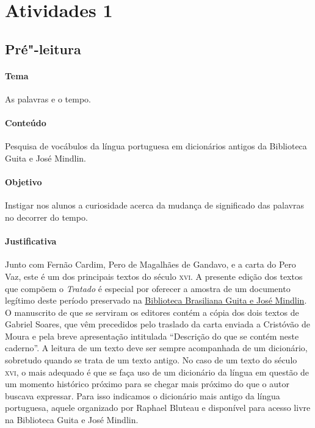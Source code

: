 \documentclass[12pt]{extarticle}
\begin{document}
\tableofcontents

\section{Atividades 1}


\subsection{Pré"-leitura}


\paragraph{Tema} As palavras e o tempo. 

\paragraph{Conteúdo} Pesquisa de vocábulos da língua portuguesa em 
dicionários antigos da Biblioteca Guita e José Mindlin. 

\paragraph{Objetivo} Instigar nos alunos a curiosidade acerca da mudança
de significado das palavras no decorrer do tempo. 

\paragraph{Justificativa} Junto com Fernão Cardim, Pero de Magalhães de 
Gandavo, e a carta do Pero Vaz, este é um dos principais textos do século 
\textsc{xvi}. A presente edição dos textos que compõem o \emph{Tratado} 
é especial por oferecer a amostra de um documento legítimo deste período
preservado na \href{https://digital.bbm.usp.br/view/?45000009023#page/1/mode/2up}{Biblioteca Brasiliana Guita e José Mindlin}. O manuscrito 
de que se serviram os editores contém a cópia dos dois textos de Gabriel 
Soares, que vêm precedidos pelo traslado da carta enviada a Cristóvão de 
Moura e pela breve apresentação intitulada “Descrição do que se contém 
neste caderno”. 
A leitura de um texto deve ser sempre acompanhada de um dicionário,
sobretudo quando se trata de um texto antigo. No caso de um texto do 
século \textsc{xvi}, o mais adequado é que se faça uso de um dicionário 
da língua em questão de um momento histórico próximo para se chegar mais 
próximo do que o autor buscava expressar. Para isso indicamos o dicionário 
mais antigo da língua portuguesa, aquele organizado por Raphael Bluteau e 
disponível para acesso livre na Biblioteca Guita e José Mindlin.
\end{document}
